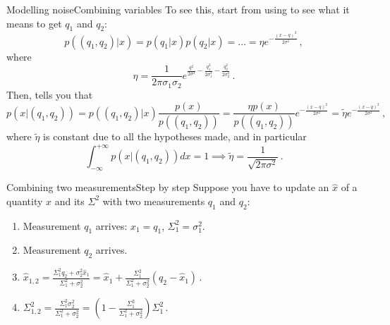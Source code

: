 \begin{frame}{Modelling noise}{Combining variables}
  To see this, start from using  to see what it means to get $q_1$ and $q_2$:
  \begin{equation*}
    p((q_1,q_2)|x) = p(q_1|x)p(q_2|x) = \dotsc = \eta e^{-\frac{(x-q)^2}{2\sigma^2}}\,,
  \end{equation*}
  where
  \begin{equation*}
    \eta = \frac{1}{2\pi\sigma_1\sigma_2} e^{\frac{q^2}{2\sigma^2} - \frac{q_1^2}{2\sigma_1^2} - \frac{q_2^2}{2\sigma_2^2}}\,.
  \end{equation*}
  Then,  tells you that
  \begin{equation*}
    p(x|(q_1,q_2)) = p((q_1,q_2)|x)\frac{p(x)}{p((q_1,q_2))} = \frac{\eta p(x)}{p((q_1,q_2))} e^{-\frac{(x-q)^2}{2\sigma^2}} = \tilde{\eta} e^{-\frac{(x-q)^2}{2\sigma^2}}\,,
  \end{equation*}
  where $\tilde{\eta}$ is constant due to all the hypotheses made, and in particular
  \begin{equation*}
    \int_{-\infty}^{+\infty} p(x|(q_1,q_2))dx = 1 \implies \tilde{\eta} = \frac{1}{\sqrt{2\pi\sigma^2}}\,.
  \end{equation*}
\end{frame}

\begin{frame}{Combining two measurements}{Step by step}
  Suppose you have to update an  $\hat{x}$ of a quantity $x$ and its  $\Sigma^2$ with two measurements $q_1$ and $q_2$:
  \begin{enumerate}
    \item Measurement $q_1$ arrives: $\hat{x}_1 = q_1$, $\Sigma_1^2=\sigma_1^2$.
    \item Measurement $q_2$ arrives.
    \item $\hat{x}_{1,2} = \frac{\Sigma_1^2 q_2 + \sigma_2^2 \hat{x}_1}{\Sigma_1^2 + \sigma_2^2} = \hat{x}_1 + \frac{\Sigma_1^2}{\Sigma_1^2+\sigma_2^2}(q_2 - \hat{x}_1)\,$.
    \item $\Sigma_{1,2}^2 = \frac{\Sigma_1^2 \sigma_2^2}{\Sigma_1^2 + \sigma_2^2} = (1-\frac{\Sigma_1^2}{\Sigma_1^2+\sigma_2^2})\Sigma_1^2\,$.
  \end{enumerate}
\end{frame}

